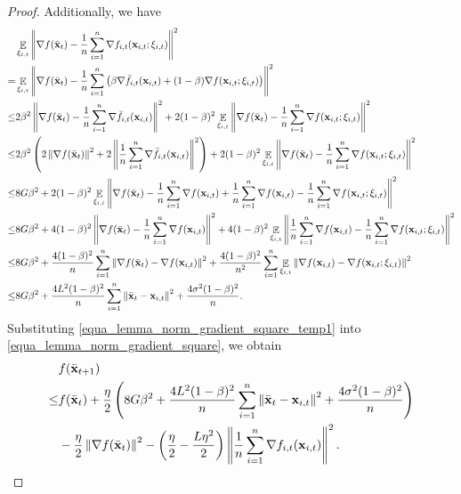 \documentclass{article}
\begin{document}
\begin{proof}
Additionally, we have
\begin{align}
\nonumber
& \mathop{\mathbb{E}}_{\xi_{i,t}}\left\lVert\nabla f(\bar{{\bf x}}_t) -\frac{1}{n}\sum_{i=1}^n \nabla f_{i,t}({\bf x}_{i,t};\xi_{i,t})\right\rVert^2 \\ \nonumber
= & \mathop{\mathbb{E}}_{\xi_{i,t}}\left\lVert\nabla f(\bar{{\bf x}}_t) -\frac{1}{n}\sum_{i=1}^n \left( \beta \nabla \bar{f}_{i,t}({\bf x}_{i,t}) + (1-\beta) \nabla f({\bf x}_{i,t};\xi_{i,t})  \right)\right\rVert^2 \\ \nonumber
\le & 2\beta^2 \left\lVert\nabla f(\bar{{\bf x}}_t) -\frac{1}{n}\sum_{i=1}^n \nabla \bar{f}_{i,t}({\bf x}_{i,t})  \right\rVert^2 + 2(1-\beta)^2 \mathop{\mathbb{E}}_{\xi_{i,t}}\left\lVert \nabla f(\bar{{\bf x}}_t) - \frac{1}{n}\sum_{i=1}^n \nabla f({\bf x}_{i,t};\xi_{i,t}) \right\rVert^2\\ \nonumber
\le & 2\beta^2\left( 2\left\lVert\nabla f(\bar{{\bf x}}_t)\right\rVert^2 + 2\left\lVert\frac{1}{n}\sum_{i=1}^n \nabla \bar{f}_{i,t}({\bf x}_{i,t})  \right\rVert^2 \right) + 2(1-\beta)^2 \mathop{\mathbb{E}}_{\xi_{i,t}}\left\lVert \nabla f(\bar{{\bf x}}_t) - \frac{1}{n}\sum_{i=1}^n \nabla f({\bf x}_{i,t};\xi_{i,t}) \right\rVert^2\\ \nonumber
\le & 8G\beta^2 + 2(1-\beta)^2 \mathop{\mathbb{E}}_{\xi_{i,t}}\left\lVert \nabla f(\bar{{\bf x}}_t) - \frac{1}{n}\sum_{i=1}^n \nabla f({\bf x}_{i,t}) + \frac{1}{n}\sum_{i=1}^n \nabla f({\bf x}_{i,t}) - \frac{1}{n}\sum_{i=1}^n \nabla f({\bf x}_{i,t};\xi_{i,t}) \right\rVert^2\\ \nonumber
\le & 8G\beta^2 + 4(1-\beta)^2 \left\lVert \nabla f(\bar{{\bf x}}_t) - \frac{1}{n}\sum_{i=1}^n \nabla f({\bf x}_{i,t})\right\rVert^2 + 4(1-\beta)^2 \mathop{\mathbb{E}}_{\xi_{i,t}}\left\lVert\frac{1}{n}\sum_{i=1}^n \nabla f({\bf x}_{i,t}) - \frac{1}{n}\sum_{i=1}^n \nabla f({\bf x}_{i,t};\xi_{i,t}) \right\rVert^2\\ \nonumber
\le & 8G\beta^2 +  \frac{4(1-\beta)^2}{n}\sum_{i=1}^n\left\lVert \nabla f(\bar{{\bf x}}_t) -  \nabla f({\bf x}_{i,t}) \right\rVert^2 + \frac{4(1-\beta)^2}{n^2}\sum_{i=1}^n \mathop{\mathbb{E}}_{\xi_{i,t}}\left\lVert\nabla f({\bf x}_{i,t}) - \nabla f({\bf x}_{i,t};\xi_{i,t}) \right\rVert^2\\ \label{equa_lemma_norm_gradient_square_temp1}
\le & 8G\beta^2 +  \frac{4L^2(1-\beta)^2}{n}\sum_{i=1}^n\left\lVert\bar{{\bf x}}_t - {\bf x}_{i,t} \right\rVert^2 + \frac{4\sigma^2(1-\beta)^2}{n}.
\end{align}
Substituting \eqref{equa_lemma_norm_gradient_square_temp1} into \eqref{equa_lemma_norm_gradient_square}, we obtain
\begin{align}
\nonumber
& f(\bar{\x}_{t+1}) \\ \nonumber
\le & f(\bar{\x}_t) + \frac{\eta}{2}\lrincir{8G\beta^2 +  \frac{4L^2(1-\beta)^2}{n}\sum_{i=1}^n\lrnorm{\bar{\x}_t - \x_{i,t} }^2 + \frac{4\sigma^2(1-\beta)^2}{n}} \\ \nonumber 
& - \frac{\eta}{2}\lrnorm{\nabla f(\bar{\x}_t)}^2 - \lrincir{\frac{\eta}{2} - \frac{L\eta^2}{2}}\lrnorm{\frac{1}{n}\sum_{i=1}^n \nabla f_{i,t}(\x_{i,t})}^2.

\end{align}
\end{proof}
\end{document}
